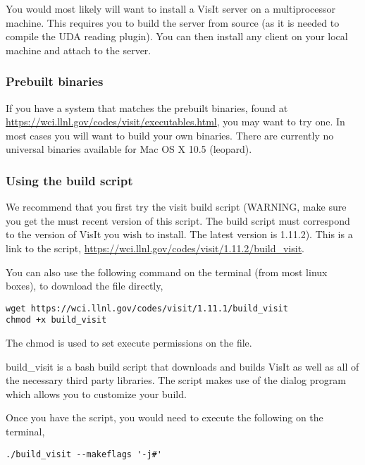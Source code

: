 You would most likely will want to install a VisIt server on a multiprocessor machine. This requires you to build the server from source (as it is needed to compile the UDA reading plugin). You can then install any client on your local machine and attach to the server. 

\subsubsection{Prebuilt binaries}
\label{sec:PrebuiltBinaries}

If you have a system that matches the prebuilt binaries, found at \url{https://wci.llnl.gov/codes/visit/executables.html}, you may want to try one. In most cases you will want to build your own binaries. There are currently no universal binaries available for Mac OS X 10.5 (leopard).

\subsubsection{Using the build script}
\label{sec:UsingTheBuildScript}

We recommend that you first try the visit build script (WARNING, make sure you get the must recent version of this script. The build script must correspond to the version of VisIt you wish to install. The latest version is 1.11.2). This is a link to the script, \url{https://wci.llnl.gov/codes/visit/1.11.2/build\_visit}.

You can also use the following command on the terminal (from most linux boxes), to download the file directly, 

\begin{Verbatim}[fontsize=\footnotesize]
wget https://wci.llnl.gov/codes/visit/1.11.1/build_visit
chmod +x build_visit
\end{Verbatim}

\normalfont The chmod is used to set execute permissions on the file.

build\_visit is a bash build script that downloads and builds VisIt as well as all of the necessary third party libraries. The script makes use of the dialog program which allows you to customize your build.

Once you have the script, you would need to execute the following on the terminal,

\begin{Verbatim}[fontsize=\footnotesize]
./build_visit --makeflags '-j#'
\end{Verbatim}
	
